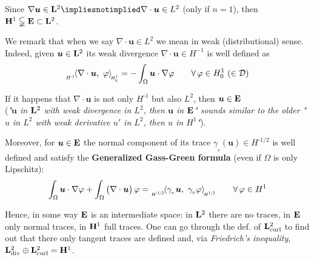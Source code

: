 \begin{itemize}
Since $\nabla\bm u\in \Lv^2 \impliesnotimplied \nabla\cdot\bm u\in L^2$ (only if $n=1$), then $\mathbf{H}^1 \subsetneqq \mathbf{E} \subset \mathbf{L}^2$. 

We remark that when we say $\nabla\cdot\bm u\in L^2$ we mean in weak (distributional) sense. Indeed, given $\bm u\in\mathbf{L}^2$ its weak divergence $\nabla\cdot \bm u\in H^{-1}$ is well defined as
\begin{equation*}
\dualH{\nabla\cdot\bm u,\ \varphi}{-1}{1}{0}=-\int_\Omega \bm u\cdot \nabla \varphi\qquad \forall\, \varphi \in H^1_0\ (\in\Dc)
\end{equation*}

If it happens that $\nabla\cdot \bm u$ is not only $H^{\text{-}1}\!$ but also $L^2$, then $\bm u\in \mathbf{E}$ \\ (\emph{"$\bm u$ in $\mathbf{L}^2$ with weak divergence in $L^2$, then $\bm u$ in $\mathbf{E}$" sounds similar to the older "$u$ in $L^2$ with weak derivative $u'$ in $L^2$, then $u$ in $H^1$"}).

Moreover, for $\bm u\in\mathbf{E}$ the normal component of its trace $\gamma_{_\nu}(\bm u)\in H^{\text{-}1/2}$ is well defined and satisfy the \textbf{Generalized Gass-Green formula} (even if $\Omega$ is only Lipschitz):
\begin{equation}
\label{eq:GG}
\int_\Omega \bm u\cdot \nabla \varphi+\int_\Omega \big(\nabla\cdot\bm u\big)\, \varphi = \dualT{\gamma_{_\nu}\bm u,\ \gamma_{_0}\varphi}{-1/2}{1/2}\qquad \forall \,\varphi\in H^1
\end{equation}

Hence, in some way $\mathbf{E}$ is an intermediate space: in $\mathbf{L}^2$ there are no traces, in $\mathbf{E}$ only normal traces, in $\mathbf{H}^1$ full traces. One can go through the def. of $\mathbf{L}^2_{\text{curl}}$ to find out that there only tangent traces are defined and, via \emph{Friedrich's inequality}, $\mathbf{L}^2_{\text{div}}\oplus\mathbf{L}^2_{\text{curl}}=\mathbf{H}^1$.

\end{itemize}


